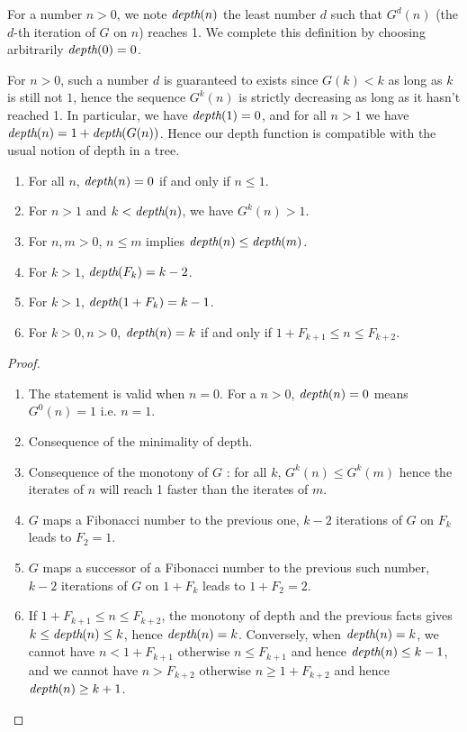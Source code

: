 \documentclass[a4paper,11pt]{article}
\begin{document}
\begin{definition}
For a number $n>0$, we note $\textit{depth}(n)$ the least number $d$ such that
$G^d(n)$ (the $d$-th iteration of $G$ on $n$) reaches 1.
We complete this definition by choosing arbitrarily $\textit{depth}(0)=0$.
\end{definition}

For $n>0$, such a number $d$ is guaranteed to exists since $G(k)<k$ as long as
$k$ is still not $1$, hence the sequence $G^k(n)$ is strictly
decreasing as long as it hasn't reached 1.
In particular, we have $\textit{depth}(1)=0$, and for all $n>1$ we have
$\textit{depth}(n) = 1+\textit{depth}(G(n))$. Hence our depth function is compatible
with the usual notion of depth in a tree.

\begin{theorem}\label{depthprops}
\noindent
\begin{enumerate}
\item For all $n$, $\textit{depth}(n)=0$ if and only if $n\le 1$.
\item For $n>1$ and $k<\textit{depth}(n)$, we have $G^k(n) > 1$.
\item For $n,m>0$, $n\le m$ implies $\textit{depth}(n)\le \textit{depth}(m)$.
\item For $k>1$, $\textit{depth}(F_k) = k-2$.
\item For $k>1$, $\textit{depth}(1+F_k) = k-1$.
\item For $k>0,n>0$, $\textit{depth}(n)=k$ if and only if $1+F_{k+1} \leq n \leq
  F_{k+2}$.
\end{enumerate}
\end{theorem}
\begin{proof}
\noindent
\begin{enumerate}
\item The statement is valid when $n=0$. For a $n>0$, 
$\textit{depth}(n)=0$ means $G^0(n)=1$ i.e. $n=1$.
\item Consequence of the minimality of depth.
\item Consequence of the monotony of $G$ :
  for all $k$, $G^k(n)\le G^k(m)$ hence the iterates of $n$ will reach
  1 faster than the iterates of $m$.
\item $G$ maps a Fibonacci number to the previous one, $k-2$
  iterations of $G$ on $F_k$ leads to $F_2=1$.
\item $G$ maps a successor of a Fibonacci number to the previous such
  number, $k-2$ iterations of $G$ on $1+F_k$ leads to $1+F_2 = 2$.
\item If $1+F_{k+1} \leq n \leq F_{k+2}$, the monotony of depth and the
previous facts gives $k \le \textit{depth}(n) \le k$, hence $\textit{depth}(n)=k$.
Conversely, when $\textit{depth}(n)=k$, we cannot have $n < 1 + F_{k+1}$ otherwise
$n \le F_{k+1}$ and hence $\textit{depth}(n)\le k-1$, and we cannot have $n > F_{k+2}$
otherwise $n \ge 1+F_{k+2}$ and hence $\textit{depth}(n)\ge k+1$.
\end{enumerate}
\end{proof}
\end{document}

